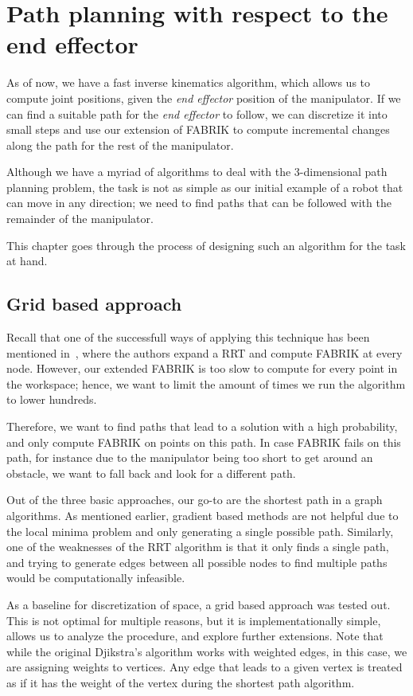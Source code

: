 \chapter{Path planning with respect to the end effector}

As of now, we have a fast inverse kinematics algorithm, which allows us to compute joint positions, given the \textit{end effector} position of the manipulator. If we can find a suitable path for the \textit{end effector} to follow, we can discretize it into small steps and use our extension of FABRIK to compute incremental changes along the path for the rest of the manipulator.

Although we have a myriad of algorithms to deal with the 3-dimensional path planning problem, the task is not as simple as our initial example of a robot that can move in any direction; we need to find paths that can be followed with the remainder of the manipulator.

This chapter goes through the process of designing such an algorithm for the task at hand.

\section{Grid based approach}

Recall that one of the successfull ways of applying this technique has been mentioned in~\cite{rrt_fabrik}, where the authors expand a RRT and compute FABRIK at every node. However, our extended FABRIK is too slow to compute for every point in the workspace; hence, we want to limit the amount of times we run the algorithm to lower hundreds.

Therefore, we want to find paths that lead to a solution with a high probability, and only compute FABRIK on points on this path. In case FABRIK fails on this path, for instance due to the manipulator being too short to get around an obstacle, we want to fall back and look for a different path.

Out of the three basic approaches, our go-to are the shortest path in a graph algorithms. As mentioned earlier, gradient based methods are not helpful due to the local minima problem and only generating a single possible path. Similarly, one of the weaknesses of the RRT algorithm is that it only finds a single path, and trying to generate edges between all possible nodes to find multiple paths would be computationally infeasible.

As a baseline for discretization of space, a grid based approach was tested out. This is not optimal for multiple reasons, but it is implementationally simple, allows us to analyze the procedure, and explore further extensions. Note that while the original Djikstra's algorithm works with weighted edges, in this case, we are assigning weights to vertices. Any edge that leads to a given vertex is treated as if it has the weight of the vertex during the shortest path algorithm.

